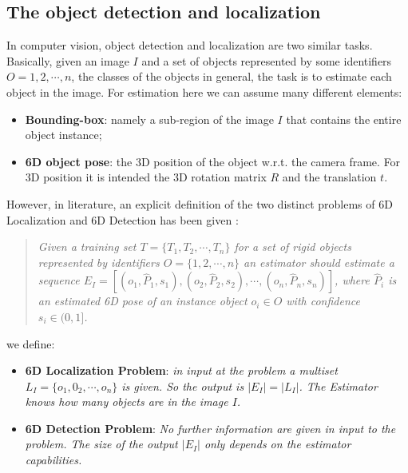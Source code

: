 \subsection{The object detection and localization}\label{subsec:detection_and_localization}
In computer vision, object detection and localization are two similar tasks. Basically, given an image $I$ and a set of objects represented by some identifiers $O = {1, 2, \cdots, n}$, the classes of the objects in general, the task is to estimate each object in the image. For estimation here we can assume many different elements:

\begin{itemize}
	\item \textbf{Bounding-box}: namely a sub-region of the image $I$ that contains the entire object instance;
	\item \textbf{6D object pose}: the 3D position of the object w.r.t. the camera frame. For 3D position it is intended the 3D rotation matrix $R$ and the translation $t$.
\end{itemize}

However, in literature, an explicit definition of the two distinct problems of 6D Localization and 6D Detection has been given \cite{hodan20166DPoseEstimation}:

\begin{quotation}
\emph{Given a training set $T = \{T_1 , T_2 , \cdots , T_n \}$ for a set of rigid objects represented by identifiers $O = \{1, 2, \cdots , n\}$ an estimator should estimate a sequence $E_I = [(o_1, \hat{P}_1, s_1), (o_2, \hat{P}_2, s_2), \cdots , (o_n, \hat{P}_n, s_n)]$, where $\hat{P}_i$ is an estimated 6D pose of an instance object $o_i \in O$ with confidence $s_i \in (0, 1]$.}
\end{quotation}

we define:

\begin{itemize}
	\item \textbf{6D Localization Problem}: \emph{in input at the problem a multiset $L_I = \{o_1, 0_2, \cdots, o_n\}$ is given. So the output is $|E_I| = |L_I|$. The Estimator knows how many objects are in the image $I$.}
	\item \textbf{6D Detection Problem}: \emph{No further information are given in input to the problem. The size of the output $|E_I|$ only depends on the estimator capabilities.}
\end{itemize}

